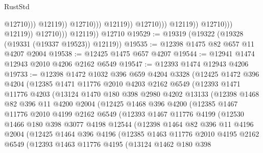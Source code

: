 \begin{lexlean}{RustStd}
\begin{coremodule}
                                                      @12710)))
                                                @12119))
                                            @12710)))
                                      @12119))
                                  @12710)))
                            @12119))
                        @12710)))
                  @12119))
              @12710)))
        @12119))
    @12710
@19529 := @19319 (@19322 (@19328 (@19331 (@19337 @19523)) @12119))
@19535 := @12398 @1475 @82 @657 @11 @4207 @2004
@19538 := @12425 @1475 @657 @4207
@19544 := @12941 @1474 @12943 @2010 @4206 @2162 @6549
@19547 := @12393 @1474 @12943 @4206
@19733 := @12398
    @1472
    @1032
    @396
    @659
    @4204
    @3328
    (@12425
      @1472
      @396
      @4204
      (@12385
        @1471
        @11776
        @2010
        @4203
        @2162
        @6549
        (@12393
          @1471
          @11776
          @4203
          (@13124
            @1470
            @180
            @398
            @2980
            @4202
            @13133
            (@12398
              @1468
              @82
              @396
              @11
              @4200
              @2004
              (@12425
                @1468
                @396
                @4200
                (@12385
                  @1467
                  @11776
                  @2010
                  @4199
                  @2162
                  @6549
                  (@12393
                    @1467
                    @11776
                    @4199
                    (@12530
                      @1466
                      @180
                      @398
                      @3077
                      @4198
                      @12544
                      (@12398
                        @1464
                        @82
                        @396
                        @11
                        @4196
                        @2004
                        (@12425
                          @1464
                          @396
                          @4196
                          (@12385
                            @1463
                            @11776
                            @2010
                            @4195
                            @2162
                            @6549
                            (@12393
                              @1463
                              @11776
                              @4195
                              (@13124
                                @1462
                                @180
                                @398

\end{coremodule}
\end{lexlean}

